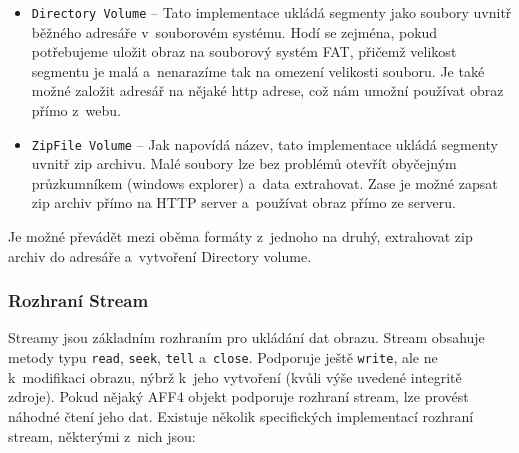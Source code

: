 \begin{itemize}
\item \texttt{Directory Volume} -- Tato implementace ukládá segmenty jako soubory uvnitř běžného adresáře v~souborovém systému. Hodí se zejména, pokud potřebujeme uložit obraz na souborový systém FAT, přičemž velikost segmentu je malá a~nenarazíme tak na omezení velikosti souboru. Je také možné založit adresář na nějaké http adrese, což nám umožní používat obraz přímo z~webu.

\item \texttt{ZipFile Volume} -- Jak napovídá název, tato implementace ukládá segmenty uvnitř zip archivu. Malé soubory lze bez problémů otevřít obyčejným průzkumníkem (windows explorer) a~data extrahovat. Zase je možné zapsat zip archiv přímo na HTTP server a~používat obraz přímo ze serveru.
\end{itemize}

\noindent Je možné převádět mezi oběma formáty z~jednoho na druhý, extrahovat zip archiv do adresáře a~vytvoření Directory volume.

\subsubsection{Rozhraní Stream}
Streamy jsou základním rozhraním pro ukládání dat obrazu. Stream obsahuje metody typu \texttt{read}, \texttt{seek}, \texttt{tell} a~\texttt{close}. Podporuje ještě \texttt{write}, ale ne k~modifikaci obrazu, nýbrž k~jeho vytvoření (kvůli výše uvedené integritě zdroje). Pokud nějaký AFF4 objekt podporuje rozhraní stream, lze provést náhodné čtení jeho dat. Existuje několik specifických implementací rozhraní stream, některými z~nich jsou:


